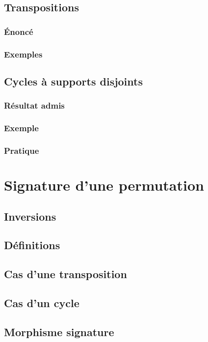 \documentclass[12pt,a4paper,french]{book}
\begin{document}
		\subsection{Transpositions}
			\subsubsection{Énoncé}
			\subsubsection{Exemples}
		\subsection{Cycles à supports disjoints}
			\subsubsection{Résultat admis}
			\subsubsection{Exemple}
			\subsubsection{Pratique}
	\section{Signature d'une permutation}
		\subsection{Inversions}
		\subsection{Définitions}
		\subsection{Cas d'une transposition}
		\subsection{Cas d'un cycle}
		\subsection{Morphisme signature}
			
\end{document}
